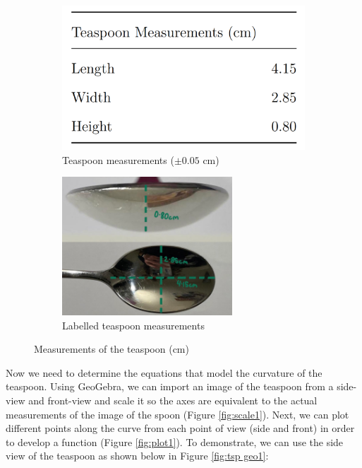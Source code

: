 \documentclass[12pt]{article}
\begin{document}
\begin{figure}[h]
     \centering
     \begin{subfigure}[b]{0.45\textwidth}
         \centering
         \includegraphics[width=\textwidth]{images/measure table.png}
         \caption{Teaspoon measurements ($\pm 0.05$ cm)}
         \label{fig:tab.meas}
     \end{subfigure}
     \hfill
     \begin{subfigure}[b]{0.45\textwidth}
         \centering
         \includegraphics[width=0.7\textwidth]{images/sp measure.png}
         \caption{Labelled teaspoon measurements}
         \label{fig:tsp.meas}
     \end{subfigure}
     \hfill
        \caption{Measurements of the teaspoon (cm)}
        \label{fig:measure.tsp}
\end{figure}

Now we need to determine the equations that model the curvature of the teaspoon. Using GeoGebra, we can import an image of the teaspoon from a side-view and front-view and scale it so the axes are equivalent to the actual measurements of the image of the spoon (Figure \ref{fig:scale1}). Next, we can plot different points along the curve from each point of view (side and front) in order to develop a function (Figure \ref{fig:plot1}). To demonstrate, we can use the side view of the teaspoon as shown below in Figure \ref{fig:tsp geo1}:
\end{document}
